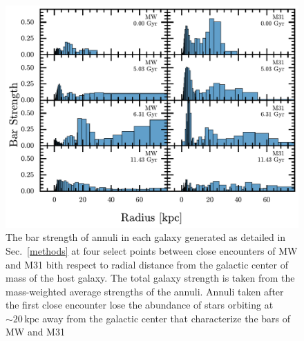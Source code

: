 \documentclass[twocolumn]{aastex631}
\DeclareRobustCommand{\Secref}[1]{Sec.~\ref{#1}}
\begin{document}
    
\FloatBarrier
\begin{figure}[h!]
  \centering
  \includegraphics[width=1.0\textwidth]{bar_histogram}
  \caption{The bar strength of annuli in each galaxy generated as
    detailed in \Secref{methods} at four select points between close
    encounters of MW and M31 bith respect to radial distance from the
    galactic center of mass of the host galaxy. The total galaxy
    strength is taken from the mass-weighted average strengths of the
    annuli. Annuli taken after the first close encounter lose the
    abundance of stars orbiting at $\sim 20\,\mathrm{kpc}$ away from the
    galactic center that characterize the bars of MW and M31}
  \label{fig:annuli}
\end{figure}
\FloatBarrier
\end{document}
